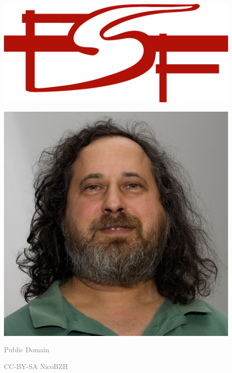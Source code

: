 \documentclass[presentation]{beamer}
\begin{document}
\begin{frame}[label=sec-3-5]{}
\begin{columns}
\begin{column}{0.45\textwidth}
\begin{varblock}[\textwidth]{}
\begin{minipage}[c]{0.5\linewidth}
\includegraphics[width=0.9\textwidth]{images/fsf-only}
\end{minipage}\hfill
\begin{minipage}[c]{0.5\linewidth}
\includegraphics[width=0.9\textwidth]{images/NicoBZH_-_Richard_Stallman_(by-sa)_(5).jpg}
\end{minipage}
\end{varblock}
\vspace{-0.6cm}
\begin{minipage}[c]{0.5\linewidth}
    \tiny \textcolor{gray}{Public Domain}
\end{minipage}\hfill
\begin{minipage}[c]{0.5\linewidth}
\tiny \textcolor{gray}{CC-BY-SA NicoBZH}
\end{minipage}
\vspace{-0.2cm}
\end{column}


\end{columns}
\end{frame}
\end{document}

